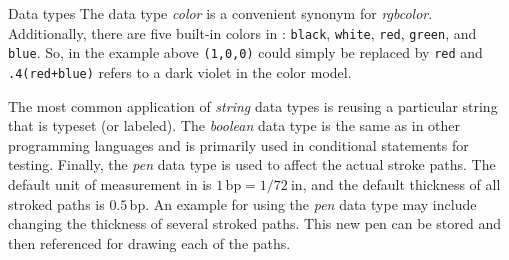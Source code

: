 \begin{section}{Data types}
The data type \textit{color} is a convenient synonym for
\textit{rgbcolor}.  Additionally, there are five built-in \RGB{} colors
in \MP{}: \texttt{black}, \texttt{white}, \texttt{red}, \texttt{green},
and \texttt{blue}.  So, in the example above \texttt{(1,0,0)} could
simply be replaced by \texttt{red} and \texttt{.4(red+blue)} refers to a
dark violet in the \RGB{} color model.

The most common application of \textit{string} data types is reusing a
particular string that is typeset (or labeled).  The \textit{boolean}
data type is the same as in other programming languages and is primarily used in
conditional statements for testing.  Finally, the \textit{pen} data type
is used to affect the actual stroke paths.  The default unit of
measurement in \MP{} is $1\,\mathrm{bp}=1/72\mathrm{\ in}$, and the
default thickness of all stroked paths is $0.5\,\mathrm{bp}$.  An
example for using the \textit{pen} data type may include changing the
thickness of several stroked paths.  This new pen can be stored and then
referenced for drawing each of the paths.
\end{section}
